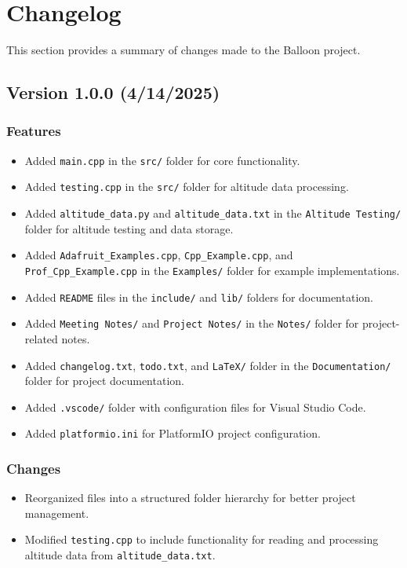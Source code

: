 \documentclass{article}
\begin{document}
\section{Changelog}
This section provides a summary of changes made to the Balloon project.



\subsection{Version 1.0.0 (4/14/2025)}
\subsubsection{Features}
\begin{itemize}
    \item Added \texttt{main.cpp} in the \texttt{src/} folder for core functionality.
    \item Added \texttt{testing.cpp} in the \texttt{src/} folder for altitude data processing.
    \item Added \texttt{altitude\_data.py} and \texttt{altitude\_data.txt} in the \texttt{Altitude Testing/} folder for altitude testing and data storage.
    \item Added \texttt{Adafruit\_Examples.cpp}, \texttt{Cpp\_Example.cpp}, and \texttt{Prof\_Cpp\_Example.cpp} in the \texttt{Examples/} folder for example implementations.
    \item Added \texttt{README} files in the \texttt{include/} and \texttt{lib/} folders for documentation.
    \item Added \texttt{Meeting Notes/} and \texttt{Project Notes/} in the \texttt{Notes/} folder for project-related notes.
    \item Added \texttt{changelog.txt}, \texttt{todo.txt}, and \texttt{LaTeX/} folder in the \texttt{Documentation/} folder for project documentation.
    \item Added \texttt{.vscode/} folder with configuration files for Visual Studio Code.
    \item Added \texttt{platformio.ini} for PlatformIO project configuration.
\end{itemize}



\subsubsection{Changes}
\begin{itemize}
    \item Reorganized files into a structured folder hierarchy for better project management.
    \item Modified \texttt{testing.cpp} to include functionality for reading and processing altitude data from \texttt{altitude\_data.txt}.
\end{itemize}
\end{document}
